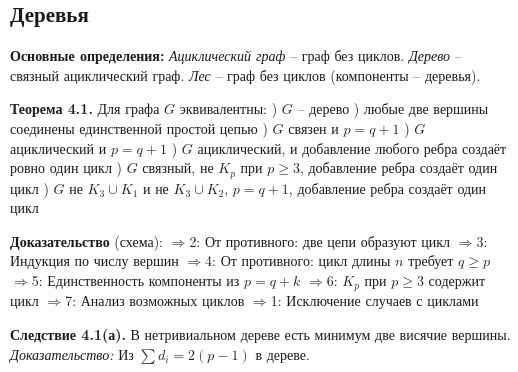 \subsection{Деревья}

\noindent\textbf{Основные определения:}
\noindent\textit{Ациклический граф} -- граф без циклов.
\noindent\textit{Дерево} -- связный ациклический граф.
\noindent\textit{Лес} -- граф без циклов (компоненты -- деревья).

\noindent\textbf{Теорема 4.1.} Для графа $G$ эквивалентны:
) $G$ -- дерево
) любые две вершины соединены единственной простой цепью
) $G$ связен и $p = q + 1$
) $G$ ациклический и $p = q + 1$
) $G$ ациклический, и добавление любого ребра создаёт ровно один цикл
) $G$ связный, не $K_p$ при $p \geq 3$, добавление ребра создаёт один цикл
) $G$ не $K_3 \cup K_1$ и не $K_3 \cup K_2$, $p = q + 1$, добавление ребра создаёт один цикл

\noindent\textbf{Доказательство} (схема):
$\Rightarrow$2: От противного: две цепи образуют цикл
$\Rightarrow$3: Индукция по числу вершин
$\Rightarrow$4: От противного: цикл длины $n$ требует $q \geq p$
$\Rightarrow$5: Единственность компоненты из $p = q + k$
$\Rightarrow$6: $K_p$ при $p \geq 3$ содержит цикл
$\Rightarrow$7: Анализ возможных циклов
$\Rightarrow$1: Исключение случаев с циклами

\noindent\textbf{Следствие 4.1(а).} В нетривиальном дереве есть минимум две висячие вершины.
\noindent\textit{Доказательство:} Из $\sum d_i = 2(p-1)$ в дереве.